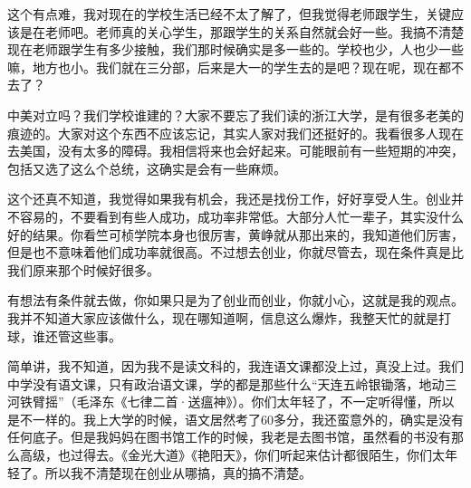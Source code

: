 

这个有点难，我对现在的学校生活已经不太了解了，但我觉得老师跟学生，关键应该是在老师吧。老师真的关心学生，那跟学生的关系自然就会好一些。我搞不清楚现在老师跟学生有多少接触，我们那时候确实是多一些的。学校也少，人也少一些嘛，地方也小。我们就在三分部，后来是大一的学生去的是吧？现在呢，现在都不去了？




中美对立吗？我们学校谁建的？大家不要忘了我们读的浙江大学，是有很多老美的痕迹的。大家对这个东西不应该忘记，其实人家对我们还挺好的。我看很多人现在去美国，没有太多的障碍。我相信将来也会好起来。可能眼前有一些短期的冲突，包括又选了这么个总统，这确实是会有一些麻烦。



这个还真不知道，我觉得如果我有机会，我还是找份工作，好好享受人生。创业并不容易的，不要看到有些人成功，成功率非常低。大部分人忙一辈子，其实没什么好的结果。你看竺可桢学院本身也很厉害，黄峥就从那出来的，我知道他们厉害，但是也不意味着他们成功率就很高。不过想去创业，你就尽管去，现在条件真是比我们原来那个时候好很多。


有想法有条件就去做，你如果只是为了创业而创业，你就小心，这就是我的观点。我并不知道大家应该做什么，现在哪知道啊，信息这么爆炸，我整天忙的就是打球，谁还管这些事。



简单讲，我不知道，因为我不是读文科的，我连语文课都没上过，真没上过。我们中学没有语文课，只有政治语文课，学的都是那些什么“天连五岭银锄落，地动三河铁臂摇”（毛泽东《七律二首·送瘟神》）。你们太年轻了，不一定听得懂，所以是不一样的。我上大学的时候，语文居然考了60多分，我还蛮意外的，确实是没有任何底子。但是我妈妈在图书馆工作的时候，我老是去图书馆，虽然看的书没有那么高级，也过得去。《金光大道》《艳阳天》，你们听起来估计都很陌生，你们太年轻了。所以我不清楚现在创业从哪搞，真的搞不清楚。

